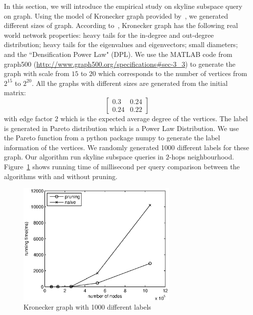 In this section, we will introduce the empirical study on skyline subspace query on graph.
Using the model of Kronecker graph provided by~\cite{leskovec2005realistic}, we generated different sizes of graph.
According to~\cite{leskovec2005realistic}, Kronecker graph has the following real world network properties:
heavy tails for the in-degree and out-degree distribution;
heavy tails for the eigenvalues and eigenvectors;
small diameters; and the ``Densification Power Law" (DPL).
We use the MATLAB code from graph500 (\url{http://www.graph500.org/specifications#sec-3_3}) to generate the graph with scale from $15$ to $20$ which corresponds to the number of vertices from $2^{15}$ to $2^{20}$. All the graphs with different sizes are generated from the initial matrix:
\begin{equation}
\begin{bmatrix}
0.3 & 0.24\\ 
0.24 & 0.22
\end{bmatrix}
\end{equation}
with edge factor $2$ which is the expected average degree of the vertices. The label is generated in Pareto distribution which is a Power Law Distribution. We use the Pareto function from a python package numpy to generate the label information of the vertices. We randomly generated 1000 different labels for these graph. Our algorithm run skyline subspace queries in $2$-hops neighbourhood. Figure~\ref{fig:exp:kronecker} shows running time of millisecond per query comparison between the algorithms with and without pruning.

\begin{figure}[h]
    \centering
      \includegraphics[width=0.7\textwidth]{figs/kronecker}
    \caption{\label{fig:exp:kronecker}Kronecker graph with 1000 different labels}
\end{figure}

